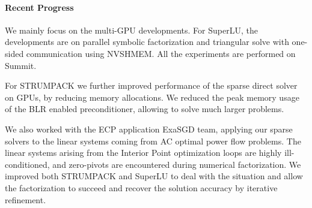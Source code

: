 \paragraph{Recent Progress}


We mainly focus on the multi-GPU developments. For SuperLU, the developments are
on parallel symbolic
factorization and triangular solve with one-sided communication using NVSHMEM. All the experiments
are performed on Summit.


For STRUMPACK we further improved performance of the sparse direct
solver on GPUs, by reducing memory allocations. We reduced the peak
memory usage of the BLR enabled preconditioner, allowing to solve much
larger problems.

We also worked with the ECP application ExaSGD team, applying our sparse solvers to
the linear systems coming from AC optimal power flow problems. The linear systems
arising from the Interior Point optimization loops are highly ill-conditioned,
and zero-pivots are encountered during numerical factorization.
We improved both STRUMPACK and SuperLU to deal with the situation and allow the factorization
to succeed and recover the solution accuracy by iterative refinement.

